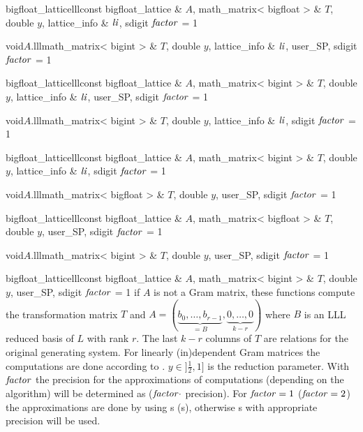 \begin{fcode}{bigfloat_lattice}{lll}{const bigfloat_lattice & $A$, math_matrix< bigfloat > & $T$,
    double $y$, lattice_info & $\mathit{li}$, sdigit $\mathit{factor}$ = 1}%
\end{fcode}

\begin{fcode}{void}{$A$.lll}{math_matrix< bigint > & $T$, double $y$, lattice_info & $\mathit{li}$,
    user_SP, sdigit $\mathit{factor}$ = 1}%
\end{fcode}

\begin{fcode}{bigfloat_lattice}{lll}{const bigfloat_lattice & $A$, math_matrix< bigint > & $T$,
    double $y$, lattice_info & $\mathit{li}$, user_SP, sdigit $\mathit{factor}$ = 1}%
\end{fcode}

\begin{fcode}{void}{$A$.lll}{math_matrix< bigint > & $T$, double $y$, lattice_info & $\mathit{li}$,
    sdigit $\mathit{factor}$ = 1}%
\end{fcode}

\begin{fcode}{bigfloat_lattice}{lll}{const bigfloat_lattice & $A$, math_matrix< bigint > & $T$,
    double $y$, lattice_info & $\mathit{li}$, sdigit $\mathit{factor}$ = 1}%
\end{fcode}

\begin{fcode}{void}{$A$.lll}{math_matrix< bigfloat > & $T$, double $y$, user_SP,
    sdigit $\mathit{factor}$ = 1}%
\end{fcode}

\begin{fcode}{bigfloat_lattice}{lll}{const bigfloat_lattice & $A$, math_matrix< bigfloat > & $T$,
    double $y$, user_SP, sdigit $\mathit{factor}$ = 1}%
\end{fcode}

\begin{fcode}{void}{$A$.lll}{math_matrix< bigint > & $T$, double $y$, user_SP, sdigit $\mathit{factor}$ = 1}
\end{fcode}

\begin{fcode}{bigfloat_lattice}{lll}{const bigfloat_lattice & $A$, math_matrix< bigint > & $T$,
    double $y$, user_SP, sdigit $\mathit{factor}$ = 1}%
  if $A$ is not a Gram matrix, these functions compute the transformation matrix $T$ and $A =
  (\underbrace{b_0, \dots, b_{r-1}}_{=B}, \underbrace{0, \dots, 0}_{k-r})$ where $B$ is an LLL
  reduced basis of $L$ with rank $r$.  The last $k-r$ columns of $T$ are relations for the
  original generating system.  For linearly (in)dependent Gram matrices the computations are
  done according to \cite{Cohen:1995}.  $y\in ]\frac{1}{2},1]$ is the reduction parameter.  With
  $\mathit{factor}$ the precision for the approximations of computations (depending on the algorithm)
  will be determined as ($\mathit{factor} \cdot$  precision).  For $\mathit{factor} = 1$ ($\mathit{factor}
  = 2$) the approximations are done by using s (s), otherwise
  s with appropriate precision will be used.
\end{fcode}


